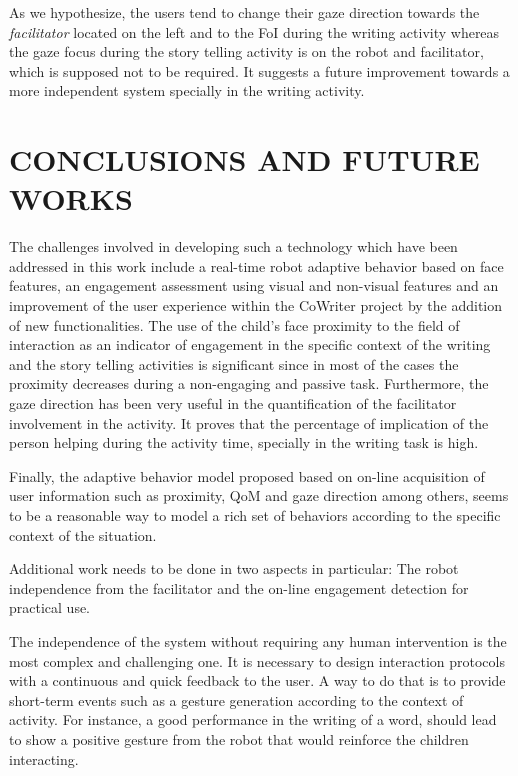\documentclass[a4paper, 10pt, conference]{ieeeconf}      %
\begin{document}
As we hypothesize, the users tend to change their gaze direction towards the \textit{facilitator} located on the left and to the FoI during the writing activity whereas the gaze focus during the story telling activity is on the robot and facilitator, which is supposed not to be required. It suggests a future improvement towards a more independent system specially in the writing activity.

\section{CONCLUSIONS AND FUTURE WORKS}

The challenges involved in developing such a technology which have been addressed in this work include a real-time robot adaptive behavior based on face features, an engagement assessment using visual and non-visual features and an improvement of the user experience within the CoWriter project by the addition of new functionalities. The use of the child's face proximity to the field of interaction as an indicator of engagement in the specific context of the writing and the story telling activities is significant since in most of the cases the proximity decreases during a non-engaging and passive task. Furthermore, the gaze direction has been very useful in the quantification of the facilitator involvement in the activity. It proves that the percentage of implication of the person helping during the activity time, specially in the writing task is high. 

Finally, the adaptive behavior model proposed based on on-line acquisition of user information such as proximity, QoM and gaze direction among others, seems to be a reasonable way to model a rich set of behaviors according to the specific context of the situation. 



Additional work needs to be done in two aspects in particular: The robot independence from the facilitator and the on-line engagement detection for practical use.  

The independence of the system without requiring any human intervention is the most complex and challenging one. It is necessary to design interaction protocols with a continuous and quick feedback to the user. A way to do that is to provide short-term events such as a gesture generation according to the context of activity. For instance, a good performance in the writing of a word, should lead to show a positive gesture from the robot that would reinforce the children interacting.

\addtolength{\textheight}{-14.5cm}




\end{document}
